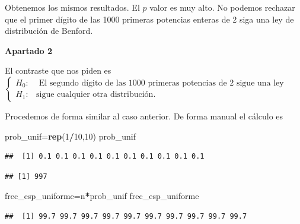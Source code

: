 \documentclass[
]{article}
\newenvironment{Shaded}{\begin{snugshade}}{\end{snugshade}}
\newcommand{\DecValTok}[1]{\textcolor[rgb]{0.00,0.00,0.81}{#1}}
\newcommand{\KeywordTok}[1]{\textcolor[rgb]{0.13,0.29,0.53}{\textbf{#1}}}
\newcommand{\NormalTok}[1]{#1}
\newcommand{\OperatorTok}[1]{\textcolor[rgb]{0.81,0.36,0.00}{\textbf{#1}}}
\begin{document}
Obtenemos los mismos resultados. El \(p\) valor es muy alto. No podemos
rechazar que el primer dígito de las 1000 primeras potencias enteras de
2 siga una ley de distribución de Benford.

\textbf{Apartado 2}

El contraste que nos piden es \[
\left\{
\begin{array}{ll}
H_0: &  \mbox{ El segundo dígito de las 1000 primeras potencias de 2 sigue una ley uniforme,}\\
H_1: & \mbox{sigue cualquier otra distribución}.
\end{array}
\right.
\]

Procedemos de forma similar al caso anterior. De forma manual el cálculo
es

\begin{Shaded}
\begin{Highlighting}[]
\NormalTok{prob\_unif=}\KeywordTok{rep}\NormalTok{(}\DecValTok{1}\OperatorTok{/}\DecValTok{10}\NormalTok{,}\DecValTok{10}\NormalTok{)}
\NormalTok{prob\_unif}
\end{Highlighting}
\end{Shaded}

\begin{verbatim}
##  [1] 0.1 0.1 0.1 0.1 0.1 0.1 0.1 0.1 0.1 0.1
\end{verbatim}

\begin{Shaded}
\end{Shaded}

\begin{verbatim}
## [1] 997
\end{verbatim}

\begin{Shaded}
\begin{Highlighting}[]
\NormalTok{frec\_esp\_uniforme=n}\OperatorTok{*}\NormalTok{prob\_unif}
\NormalTok{frec\_esp\_uniforme }
\end{Highlighting}
\end{Shaded}

\begin{verbatim}
##  [1] 99.7 99.7 99.7 99.7 99.7 99.7 99.7 99.7 99.7 99.7
\end{verbatim}
\end{document}
